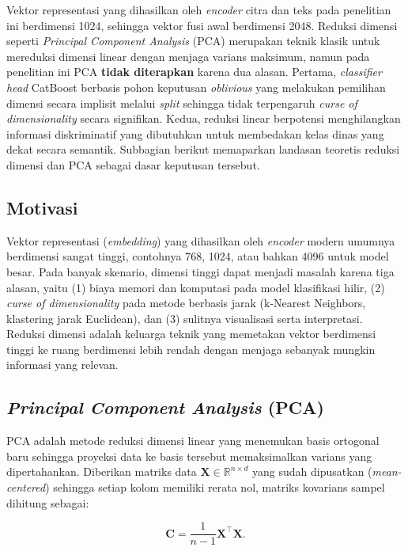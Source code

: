 Vektor representasi yang dihasilkan oleh \textit{encoder} citra dan teks pada penelitian ini berdimensi 1024, sehingga vektor fusi awal berdimensi 2048. Reduksi dimensi seperti \textit{Principal Component Analysis} (PCA) merupakan teknik klasik untuk mereduksi dimensi linear dengan menjaga varians maksimum, namun pada penelitian ini PCA \textbf{tidak diterapkan} karena dua alasan. Pertama, \textit{classifier head} CatBoost berbasis pohon keputusan \textit{oblivious} yang melakukan pemilihan dimensi secara implisit melalui \textit{split} sehingga tidak terpengaruh \textit{curse of dimensionality} secara signifikan. Kedua, reduksi linear berpotensi menghilangkan informasi diskriminatif yang dibutuhkan untuk membedakan kelas dinas yang dekat secara semantik. Subbagian berikut memaparkan landasan teoretis reduksi dimensi dan PCA sebagai dasar keputusan tersebut.

\subsection{Motivasi}
\label{sec:pca-motivasi}

Vektor representasi (\textit{embedding}) yang dihasilkan oleh \textit{encoder} modern umumnya berdimensi sangat tinggi, contohnya 768, 1024, atau bahkan 4096 untuk model besar. Pada banyak skenario, dimensi tinggi dapat menjadi masalah karena tiga alasan, yaitu (1) biaya memori dan komputasi pada model klasifikasi hilir, (2) \textit{curse of dimensionality} pada metode berbasis jarak (k-Nearest Neighbors, klastering jarak Euclidean), dan (3) sulitnya visualisasi serta interpretasi. Reduksi dimensi adalah keluarga teknik yang memetakan vektor berdimensi tinggi ke ruang berdimensi lebih rendah dengan menjaga sebanyak mungkin informasi yang relevan.

\subsection{\textit{Principal Component Analysis} (PCA)}

PCA \citep{joliffePCA2002} adalah metode reduksi dimensi linear yang menemukan basis ortogonal baru sehingga proyeksi data ke basis tersebut memaksimalkan varians yang dipertahankan. Diberikan matriks data $\mathbf{X} \in \mathbb{R}^{n \times d}$ yang sudah dipusatkan (\textit{mean-centered}) sehingga setiap kolom memiliki rerata nol, matriks kovarians sampel dihitung sebagai:

\begin{equation}
    \mathbf{C} = \frac{1}{n-1} \mathbf{X}^\top \mathbf{X}.
    \label{eq:pca_cov}
\end{equation}

